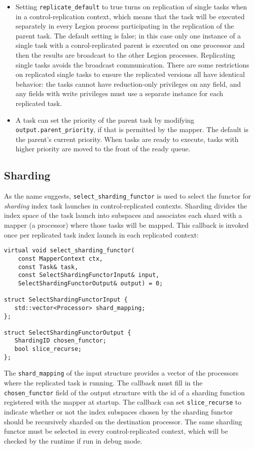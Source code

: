 \begin{itemize}
\item Setting {\tt replicate\_default} to true turns on replication of single tasks when in a control-replication context, which means that the task will be executed separately in every Legion process participating in the replication of the parent task.  The default setting
  is false; in this case only one instance of a single task with a conrol-replicated parent is executed on one processor and then the results are broadcast to the other Legion processes.  Replicating single tasks avoids the broadcast communication.  There are some restrictions on replicated single tasks to ensure the
  replicated versions all have identical behavior: the tasks cannot have reduction-only privileges on any field, and any fields with write privileges must use a separate instance for each replicated task.

\item A task can set the priority of the parent task by modifying {\tt  output.parent\_priority}, if that is permitted by the mapper.  The default is the parent's current priority.  When tasks are ready to execute, tasks with higher priority are moved to the front of the ready queue.
\end{itemize}

\subsection{Sharding}
As the name suggests, {\tt select\_sharding\_functor} is used to select the functor for {\em sharding} index task launches in control-replicated contexts.  Sharding divides the index space of the task launch into subspaces and associates each shard with a mapper (a processor)
where those tasks will be mapped.  This callback is invoked once per replicated task index launch in each replicated context:
\begin{lstlisting}
virtual void select_sharding_functor(
    const MapperContext ctx,
    const Task& task,
    const SelectShardingFunctorInput& input,
    SelectShardingFunctorOutput& output) = 0;

struct SelectShardingFunctorInput {
   std::vector<Processor> shard_mapping;
};

struct SelectShardingFunctorOutput {
   ShardingID chosen_functor;
   bool slice_recurse;
};
\end{lstlisting}
The {\tt shard\_mapping} of the input structure provides a vector of the processors where the replicated task is running.  The callback must fill in the {\tt chosen\_functor} field of the output structure with the id of a sharding function registered with the mapper at
startup.  The callback can set {\tt slice\_recurse} to indicate whether or not the index subspaces chosen by the sharding functor should be recursively sharded on the destination processor.  The same sharding functor must be selected in every control-replicated context, which
will be checked by the runtime if run in debug mode.

